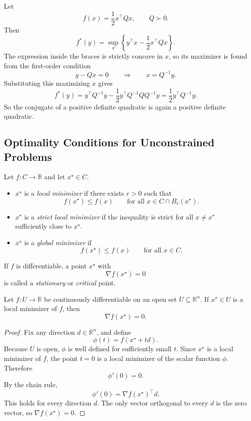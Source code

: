\begin{eg}
	Let
	\[
		f(x)=\frac{1}{2}x^\top Qx,
		\qquad Q \succ 0.
	\]
	Then
	\[
		f^\ast(y)=\sup_x \left\{y^\top x-\frac{1}{2}x^\top Qx\right\}.
	\]
	The expression inside the braces is strictly concave in $x$, so its maximizer is found from the first-order condition
	\[
		y-Qx=0
		\qquad \Longrightarrow \qquad
		x=Q^{-1}y.
	\]
	Substituting this maximizing $x$ gives
	\[
		f^\ast(y)
		= y^\top Q^{-1}y - \frac{1}{2}y^\top Q^{-1}QQ^{-1}y
		= \frac{1}{2}y^\top Q^{-1}y.
	\]
	So the conjugate of a positive definite quadratic is again a positive definite quadratic.
\end{eg}

\subsection{Optimality Conditions for Unconstrained Problems}
\label{sec:l1-optimality-conditions-for-unconstrained-problems}

\begin{definition}\label{def:l1-local-and-global-minima}
	Let $f:C \to \mathbb{R}$ and let $x^\star \in C$.
	\begin{itemize}
		\item $x^\star$ is a \emph{local minimizer} if there exists $r>0$ such that
		      \[
			      f(x^\star) \le f(x)
			      \qquad \text{for all } x \in C \cap B_r(x^\star).
		      \]
		\item $x^\star$ is a \emph{strict local minimizer} if the inequality is strict for all $x \neq x^\star$ sufficiently close to $x^\star$.
		\item $x^\star$ is a \emph{global minimizer} if
		      \[
			      f(x^\star)\le f(x)
			      \qquad \text{for all } x \in C.
		      \]
	\end{itemize}
\end{definition}

\begin{definition}\label{def:l1-stationary-point}
	If $f$ is differentiable, a point $x^\star$ with
	\[
		\nabla f(x^\star)=0
	\]
	is called a \emph{stationary} or \emph{critical} point.
\end{definition}

\begin{theorem}\label{thm:l1-first-order-necessary-condition}
	Let $f:U \to \mathbb{R}$ be continuously differentiable on an open set $U \subseteq \mathbb{R}^n$. If $x^\star \in U$ is a local minimizer of $f$, then
	\[
		\nabla f(x^\star)=0.
	\]
\end{theorem}
\begin{proof}
	Fix any direction $d \in \mathbb{R}^n$, and define
	\[
		\phi(t)=f(x^\star+td).
	\]
	Because $U$ is open, $\phi$ is well defined for sufficiently small $t$. Since $x^\star$ is a local minimizer of $f$, the point $t=0$ is a local minimizer of the scalar function $\phi$. Therefore
	\[
		\phi'(0)=0.
	\]
	By the chain rule,
	\[
		\phi'(0)=\nabla f(x^\star)^\top d.
	\]
	This holds for every direction $d$. The only vector orthogonal to every $d$ is the zero vector, so $\nabla f(x^\star)=0$.
\end{proof}

